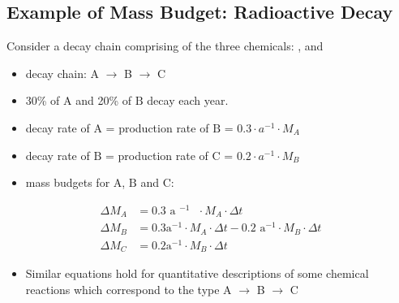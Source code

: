 \documentclass[letterpaper,10pt,english]{sphinxmanual}
\begin{document}
\subsection{Example of Mass Budget: Radioactive Decay}
\label{\detokenize{contents/background/03_basic_hydrogeology:example-of-mass-budget-radioactive-decay}}
Consider a decay chain comprising of the three chemicals: ,  and 
\begin{itemize}
\item {} 
decay chain: A \(\rightarrow\) B \(\rightarrow\) C       

\item {} 
30\% of \(\text{A}\) and 20\% of \(\text{B}\)  decay each year.

\item {} 
decay rate of \(\text{A}\)   = production rate of \(\text{B}\)   = \(0.3 \cdot a^{-1}\cdot M_A\) 

\item {} 
decay rate of \(\text{B}\) = production rate of \(\text{C}\) = \(0.2\cdot a^{-1}\cdot M_B\) 

\item {} 
mass budgets for \(\text{A}\), \(\text{B}\) and \(\text{C}\):

\end{itemize}
\begin{equation*}
\begin{split}
\Delta M_A &= 0.3 \text{ a $^{-1}$ } \cdot M_A  \cdot \Delta t  \\
\Delta M_B  &= 0.3 \text{a$^{-1}$} \cdot M_A  \cdot \Delta t - 0.2 \text{ a$^{-1}$} \cdot M_B  \cdot \Delta t \\
\Delta M_C &= 0.2 \text{a$^{-1}$} \cdot M_B  \cdot \Delta t
\end{split}
\end{equation*}\begin{itemize}
\item {} 
Similar equations hold for quantitative descriptions of some chemical reactions which correspond to the type A \(\rightarrow\) B \(\rightarrow\) C

\end{itemize}
\end{document}
